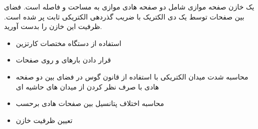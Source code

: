 \begin{ELexample}{}

یک خازن صفحه موازی شامل دو صفحه هادی موازی به مساحت  و فاصله  است. فضای بین صفحات توسط یک دی الکتریک با ضریب گذردهی الکتریکی ثابت \ELim{\epsilon} پر شده است. ظرفیت این خازن را بدست آورید.


\begin{ELsolution}

\begin{itemize}
\tightlist
\item
  استفاده از دستگاه مختصات کارتزین
\item
  قرار دادن بارهای  و  روی صفحات \ELim{\ELto} 
\item
  محاسبه شدت میدان الکتریکی با استفاده از قانون گوس در فضای بین دو صفحه هادی با صرف نظر کردن از میدان های حاشیه ای
\end{itemize}


\begin{itemize}
\tightlist
\item
  محاسبه اختلاف پتانسیل بین صفحات هادی برحسب 
\end{itemize}


\begin{itemize}
\tightlist
\item
  تعیین ظرفیت خازن
\end{itemize}


\end{ELsolution}

\end{ELexample}


